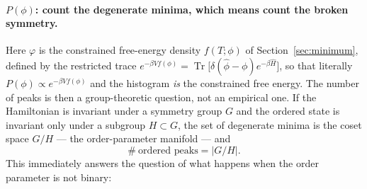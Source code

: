 \documentclass[10pt,a4paper]{article}
\theoremstyle{remark}
\newcommand{\Tr}{\operatorname{Tr}}
\begin{document}
\paragraph{$P(\phi)$: count the degenerate minima, which means count the broken
symmetry.} Here $\varphi$ is the constrained free-energy density $f(T;\phi)$ of
Section~\ref{sec:minimum}, defined by the restricted trace
$e^{-\beta Vf(\phi)}=\Tr\big[\delta(\hat\phi-\phi)e^{-\beta\hat H}\big]$, so that
literally $P(\phi)\propto e^{-\beta Vf(\phi)}$ and the histogram \emph{is} the
constrained free energy. The number of peaks is then a group-theoretic question,
not an empirical one. If the Hamiltonian is invariant under a symmetry group $G$
and the ordered state is invariant only under a subgroup $H\subset G$, the set of
degenerate minima is the coset space $G/H$ --- the order-parameter manifold ---
and
\[
\#\ \text{ordered peaks}=|G/H| .
\]
This immediately answers the question of what happens when the order parameter is
not binary:
\end{document}
